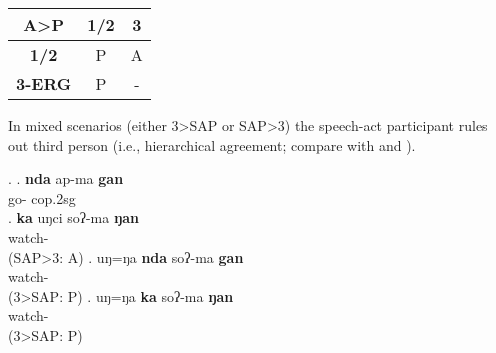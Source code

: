 \begin{center}
\begin{tabular}{c|cc}
\hline
{\bf A>P}	&{\bf 1/2}&{\bf 3}\\
\hline
 {\bf 1/2}&P&A\\
 {\bf 3-ERG}	&P&-\\
\hline
\end{tabular}
\label{align-sum-cop}
\end{center}


In mixed scenarios (either 3>SAP or SAP>3)  the speech-act participant rules out third person (i.e., hierarchical agreement; compare \Next[b] with \Next[c] and \Next[d]). 

\ex. \ag. {\bf nda}  ap-ma {\bf gan}\\
 go- {\sc cop.2sg} \\
\bg. {\bf ka} uŋci soʔ-ma  {\bf ŋan}\\
  watch-  \\  
	(SAP>3: A)
\bg. uŋ=ŋa {\bf nda}  soʔ-ma {\bf gan}\\
    watch-  \\  
	(3>SAP: P)
\bg. uŋ=ŋa {\bf ka}  soʔ-ma {\bf ŋan}\\
    watch-  \\  
	(3>SAP: P)

